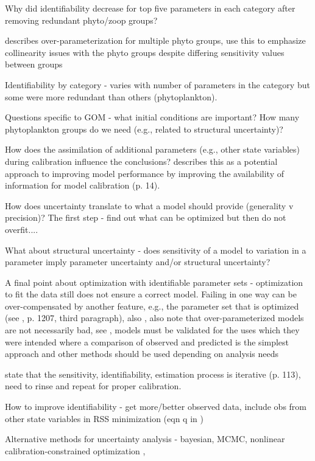\documentclass[letterpaper,12pt,oneside]{article}\usepackage[]{graphicx}\usepackage[]{color}
\begin{document}
Why did identifiability decrease for top five parameters in each category after removing redundant phyto/zoop groups?

\citep{Denman03} describes over-parameterization for multiple phyto groups, use this to emphasize collinearity issues with the phyto groups despite differing sensitivity values between groups

Identifiability by category - varies with number of parameters in the category but some were more redundant than others (phytoplankton).  

Questions specific to GOM - what initial conditions are important? How many phytoplankton groups do we need (e.g., related to structural uncertainty)?

How does the assimilation of additional parameters (e.g., other state variables) during calibration influence the conclusions?  \citet{Wagener01} describes this as a potential approach to improving model performance by improving the availability of information for model calibration (p. 14).  

How does uncertainty translate to what a model should provide (generality v precision)?  The first step - find out what can be optimized but then do not overfit....

What about structural uncertainty - does sensitivity of a model to variation in a parameter imply parameter uncertainty and/or structural uncertainty?

A final point about optimization with identifiable parameter sets - optimization to fit the data still does not ensure a correct model.  Failing in one way can be over-compensated by another feature, e.g., the parameter set that is optimized (see \cite{Flynn05}, p. 1207, third paragraph), also \citep{Durand02,Arhonditsis08}, also note that over-parameterized models are not necessarily bad, see \citep{Omlin01}, models must be validated for the uses which they were intended where a comparison of observed and predicted is the simplest approach and other methods should be used depending on analysis needs \citep{Rykiel96}

\cite{Omlin01} state that the sensitivity, identifiability, estimation process is iterative (p. 113), need to rinse and repeat for proper calibration. 

How to improve identifiability - get more/better observed data, include obs from other state variables in RSS minimization (eqn q in \cite{Omlin01})

Alternative methods for uncertainty analysis - bayesian, MCMC, nonlinear calibration-constrained optimization \citep{Gallagher07}, \citep{Arhonditsis08}
\end{document}
